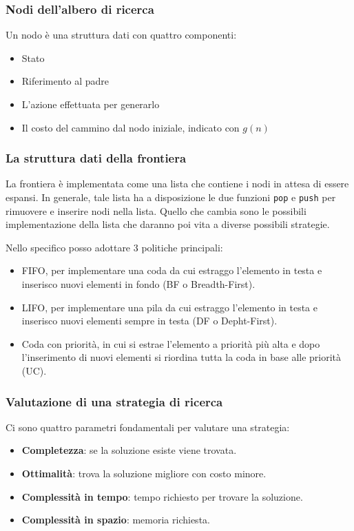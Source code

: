 \subsubsection{Nodi dell'albero di ricerca}
Un nodo \`e una struttura dati con quattro componenti:
\begin{itemize}
	\item Stato
	\item Riferimento al padre
	\item L'azione effettuata per generarlo
	\item Il costo del cammino dal nodo iniziale, indicato con $g(n)$
\end{itemize}

\subsubsection{La struttura dati della frontiera}
La frontiera \`e implementata come una lista che contiene i nodi in attesa di essere espansi.
In generale, tale lista ha a disposizione le due funzioni \verb|pop| e \verb|push| per rimuovere
e inserire nodi nella lista. Quello che cambia sono le possibili implementazione della lista
che daranno poi vita a diverse possibili strategie.

Nello specifico posso adottare 3 politiche principali:
\begin{itemize}
	\item FIFO, per implementare una coda da cui estraggo l'elemento in testa e inserisco
	      nuovi elementi in fondo (BF o Breadth-First).
	\item LIFO, per implementare una pila da cui estraggo l'elemento in testa e inserisco nuovi
	      elementi sempre in testa (DF o Depht-First).
	\item Coda con priorit\`a, in cui si estrae l'elemento a priorit\`a pi\`u alta e dopo
	      l'inserimento di nuovi elementi si riordina tutta la coda in base alle priorit\`a
	      (UC).
\end{itemize}

\subsubsection{Valutazione di una strategia di ricerca}
Ci sono quattro parametri fondamentali per valutare una strategia:
\begin{itemize}
	\item \textbf{Completezza}: se la soluzione esiste viene trovata.
	\item \textbf{Ottimalit\`a}: trova la soluzione migliore con costo minore.
	\item \textbf{Complessit\`a in tempo}: tempo richiesto per trovare la soluzione.
	\item \textbf{Complessit\`a in spazio}: memoria richiesta.
\end{itemize}

